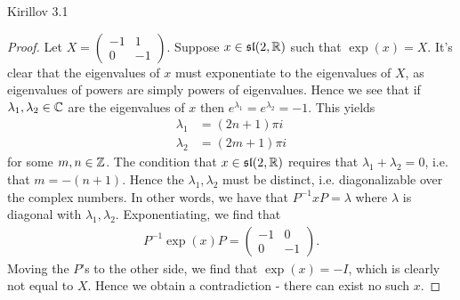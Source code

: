 \documentclass{../../mathnotes}
\begin{document}
\begin{prop}
    Kirillov 3.1
\end{prop}
\begin{proof}
    Let $X=\begin{pmatrix}-1&1\\0&-1\end{pmatrix}$. Suppose $x\in\mathfrak{sl}(2,\mathbb{R})$ such that $\exp(x)=X$. It's clear that the eigenvalues of $x$
    must exponentiate to the eigenvalues of $X$, as eigenvalues of powers are simply powers of eigenvalues. Hence we see that if $\lambda_1,\lambda_2\in\mathbb{C}$
    are the eigenvalues of $x$ then $e^{\lambda_1}=e^{\lambda_2}=-1$. This yields
    \begin{align*}
        \lambda_1&=(2n+1)\pi i\\
        \lambda_2&=(2m+1)\pi i
    \end{align*}
    for some $m,n\in\mathbb{Z}$. The condition that $x\in\mathfrak{sl}(2,\mathbb{R})$ requires that $\lambda_1+\lambda_2=0$, i.e. that $m=-(n+1)$. Hence the $\lambda_1,\lambda_2$ must be
    distinct, i.e. diagonalizable over the complex numbers. In other words, we have that $P^{-1}xP=\lambda$ where $\lambda$ is diagonal with $\lambda_1,\lambda_2$.
    Exponentiating, we find that
    \begin{align*}
        P^{-1}\exp(x)P=\begin{pmatrix}-1&0\\0&-1\end{pmatrix}.
    \end{align*}
    Moving the $P$'s to the other side, we find that $\exp(x)=-I$, which is clearly not equal to $X$. Hence we obtain a contradiction - there can exist no such $x$.
\end{proof}
\end{document}

